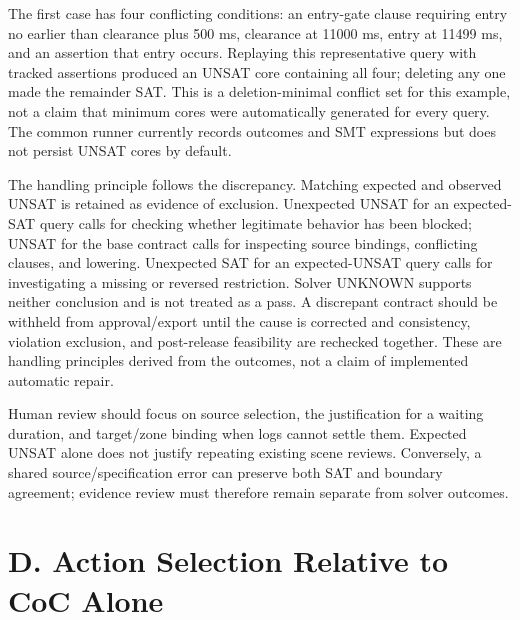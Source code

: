 \documentclass[11pt,a4paper]{article}
\begin{document}
The first case has four conflicting conditions: an entry-gate clause requiring entry no earlier than clearance plus 500 ms, clearance at 11000 ms, entry at 11499 ms, and an assertion that entry occurs. Replaying this representative query with tracked assertions produced an UNSAT core containing all four; deleting any one made the remainder SAT. This is a deletion-minimal conflict set for this example, not a claim that minimum cores were automatically generated for every query. The common runner currently records outcomes and SMT expressions but does not persist UNSAT cores by default.\par

The handling principle follows the discrepancy. Matching expected and observed UNSAT is retained as evidence of exclusion. Unexpected UNSAT for an expected-SAT query calls for checking whether legitimate behavior has been blocked; UNSAT for the base contract calls for inspecting source bindings, conflicting clauses, and lowering. Unexpected SAT for an expected-UNSAT query calls for investigating a missing or reversed restriction. Solver UNKNOWN supports neither conclusion and is not treated as a pass. A discrepant contract should be withheld from approval/export until the cause is corrected and consistency, violation exclusion, and post-release feasibility are rechecked together. These are handling principles derived from the outcomes, not a claim of implemented automatic repair.\par

Human review should focus on source selection, the justification for a waiting duration, and target/zone binding when logs cannot settle them. Expected UNSAT alone does not justify repeating existing scene reviews. Conversely, a shared source/specification error can preserve both SAT and boundary agreement; evidence review must therefore remain separate from solver outcomes.\par

\section*{D. Action Selection Relative to CoC Alone}
\end{document}
